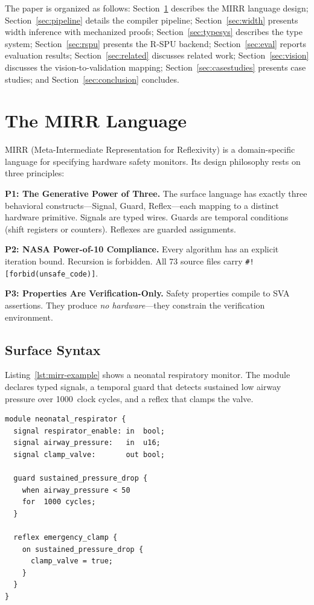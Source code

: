 \documentclass[conference]{IEEEtran}
\begin{document}
\noindent
The paper is organized as follows: Section~\ref{sec:language} describes
the MIRR language design; Section~\ref{sec:pipeline} details the compiler
pipeline; Section~\ref{sec:width} presents width inference with
mechanized proofs; Section~\ref{sec:typesys} describes the type system;
Section~\ref{sec:rspu} presents the R-SPU backend;
Section~\ref{sec:eval} reports evaluation results;
Section~\ref{sec:related} discusses related work;
Section~\ref{sec:vision} discusses the vision-to-validation mapping;
Section~\ref{sec:casestudies} presents case studies;
and Section~\ref{sec:conclusion} concludes.

\section{The MIRR Language}\label{sec:language}

MIRR (Meta-Intermediate Representation for Reflexivity) is a
domain-specific language for specifying hardware safety monitors.
Its design philosophy rests on three principles:

\textbf{P1: The Generative Power of Three.}
The surface language has exactly three behavioral constructs---Signal,
Guard, Reflex---each mapping to a distinct hardware primitive.
Signals are typed wires.  Guards are temporal conditions (shift registers
or counters).  Reflexes are guarded assignments.

\textbf{P2: NASA Power-of-10 Compliance.}
Every algorithm has an explicit iteration bound.  Recursion is forbidden.
All 73 source files carry \texttt{\#![forbid(unsafe\_code)]}.

\textbf{P3: Properties Are Verification-Only.}
Safety properties compile to SVA assertions.  They produce
\emph{no hardware}---they constrain the verification environment.

\subsection{Surface Syntax}

Listing~\ref{lst:mirr-example} shows a neonatal respiratory monitor.
The module declares typed signals, a temporal guard that detects
sustained low airway pressure over 1000~clock cycles, and a reflex that
clamps the valve.

\begin{lstlisting}[caption={Neonatal respiratory monitor in MIRR.},
  label={lst:mirr-example},float=t]
module neonatal_respirator {
  signal respirator_enable: in  bool;
  signal airway_pressure:   in  u16;
  signal clamp_valve:       out bool;

  guard sustained_pressure_drop {
    when airway_pressure < 50
    for  1000 cycles;
  }

  reflex emergency_clamp {
    on sustained_pressure_drop {
      clamp_valve = true;
    }
  }
}
\end{lstlisting}
\end{document}
